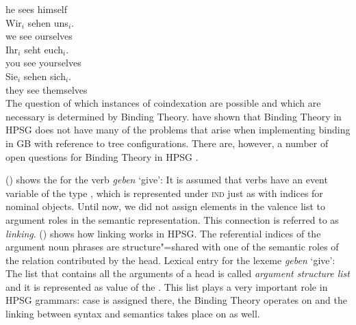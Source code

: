      he sees himself\\
\ex 
\gll Wir$_i$ sehen uns$_i$.\\
     we      see   ourselves\\
\ex 
\gll Ihr$_i$ seht euch$_i$.\\
     you see yourselves\\
\ex 
\gll Sie$_i$ sehen sich$_i$.\\
     they see themselves\\
\zl
The question of which instances of coindexation are possible and which are necessary is determined by Binding Theory.
\citet{PS92a,ps2} have shown that Binding Theory in HPSG does not have many of the problems that arise when implementing binding in GB
with reference to tree configurations. There are, however, a number of open questions for Binding Theory in HPSG \citep[Section~20.4]{Mueller99a}.

() shows the \contv for the verb \emph{geben} `give':
\ea
\label{mrs-geben}
\z
It is assumed that verbs have an event variable of the type , which is represented under \textsc{ind} just as with indices for nominal objects.
Until now, we did not assign elements in the valence list to argument roles in the semantic representation. This connection is referred to
as \emph{linking}. () shows how linking works in HPSG. The referential indices of the argument
noun phrases are structure"=shared with one of the semantic roles of the relation contributed by the
head.
\eas
\label{le-geben}
Lexical entry for the lexeme \emph{geben} `give':\\
\zs
The list that contains all the arguments of a head is called \emph{argument structure list} and it
is represented as value of the \argstf. This list plays a very important role in HPSG grammars: case
is assigned there, the Binding Theory operates on \argst and the linking between syntax and
semantics takes place on \argst as well. 

